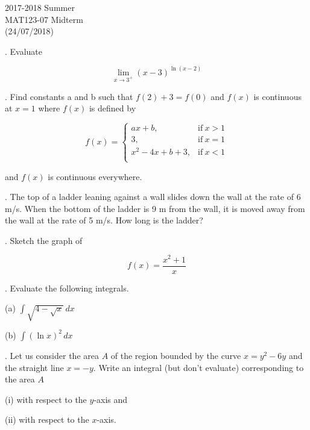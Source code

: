 \documentclass{article}
\begin{document}
\pagestyle{empty}
\large

\begin{center}
2017-2018 Summer\\MAT123-07 Midterm\\(24/07/2018)
\end{center}

. Evaluate

\[\lim_{x\to3^+}(x-3)^{\ln(x-2)}\]

\hfill

. Find constants a and b such that $f(2) + 3 = f(0)$ and $f(x)$ is continuous at $x=1$ where $f(x)$ is defined by

\[
f(x) =
\begin{cases}
ax + b, & \text{if}\ x > 1 \\
3, & \text{if}\ x = 1 \\
x^2-4x+b+3, & \text{if}\ x < 1 \\
\end{cases}
\]

\noindent and $f(x)$ is continuous everywhere.

\hfill

. The top of a ladder leaning against a wall slides down the wall at the rate of 6 m/s. When the bottom of the ladder is 9 m from the wall, it is moved away from the wall at the rate of 5 m/s. How long is the ladder?

\hfill

. Sketch the graph of

\[f(x) = \frac{x^2+1}{x}\]

\hfill

. Evaluate the following integrals.

\hfill

\noindent (a) $\displaystyle \int\sqrt{4-\sqrt{x}}\, dx$

\hfill

\noindent (b) $\displaystyle \int(\ln x)^2\, dx$

\hfill

. Let us consider the area $A$ of the region bounded by the curve $x=y^2-6y$ and the straight line $x=-y$. Write an integral (but don't evaluate) corresponding to the area $A$

\hfill

\noindent (i) with respect to the $y$-axis and

\hfill

\noindent (ii) with respect to the $x$-axis.
\end{document}
